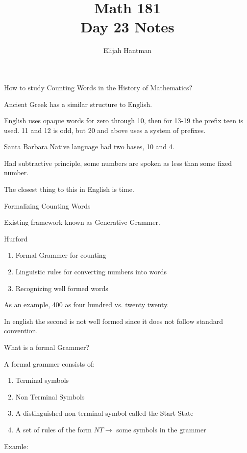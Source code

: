 \documentclass{report}
\title{\Huge{Math 181}\\Day 23 Notes}
\author{\huge{Elijah Hantman}}
\date{}
\begin{document}
\maketitle
\newpage

\begin{description}
    \item How to study Counting Words in the History
        of Mathematics?
        \begin{mdframed}
           Ancient Greek has a similar structure to 
           English. 

           English uses opaque words for zero through 10, then
           for 13-19 the prefix teen is used. 11 and 12 is
           odd, but 20 and above uses a system of prefixes.
        \end{mdframed}
        \begin{mdframed}
            Santa Barbara Native language had two bases,
            10 and 4.

            Had subtractive principle, some numbers
            are spoken as less than some fixed number.

            The closest thing to this in English is time.
        \end{mdframed}
    \item Formalizing Counting Words
        \begin{mdframed}
            Existing framework known as Generative Grammer.
        \end{mdframed}
    \item Hurford
        \begin{enumerate}
            \item Formal Grammer for counting
            \item Linguistic rules for converting numbers
                into words
            \item Recognizing well formed words
        \end{enumerate}

        \begin{mdframed}
            As an example, 400 as four hundred vs. twenty
            twenty.

            In english the second is not well formed since
            it does not follow standard convention.
        \end{mdframed}
        What is a formal Grammer?
        \begin{mdframed}
            A formal grammer consists of:
            \begin{enumerate}
                \item Terminal symbols
                \item Non Terminal Symbols
                \item A distinguished non-terminal symbol
                    called the Start State
                \item A set of rules of the form
                    $NT \to$ some symbols in the grammer
            \end{enumerate}
        \end{mdframed}
        \begin{mdframed}
            Examle:


\end{mdframed}
\end{description}
\end{document}
